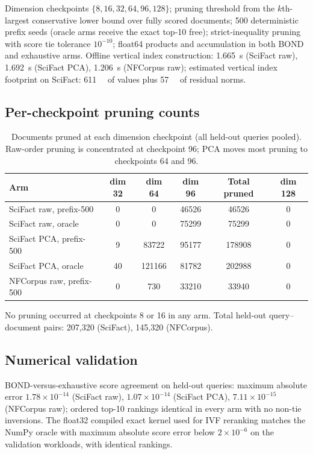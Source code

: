 Dimension checkpoints $\{8, 16, 32, 64, 96, 128\}$; pruning threshold from
the $k$th-largest conservative lower bound over fully scored documents;
500 deterministic prefix seeds (oracle arms receive the exact top-10 free);
strict-inequality pruning with score tie tolerance $10^{-10}$; float64
products and accumulation in both BOND and exhaustive arms. Offline vertical
index construction: \SI{1.665}{\second} (SciFact raw),
\SI{1.692}{\second} (SciFact PCA), \SI{1.206}{\second} (NFCorpus raw);
estimated vertical index footprint on SciFact: \SI{611}{\mega\byte} of values
plus \SI{57}{\mega\byte} of residual norms.

\subsection{Per-checkpoint pruning counts}

\begin{table}[ht]
  \centering
  \caption{Documents pruned at each dimension checkpoint (all held-out
    queries pooled). Raw-order pruning is concentrated at checkpoint 96;
    PCA moves most pruning to checkpoints 64 and 96.}
  \label{tab:checkpoints}
  \small
  \begin{tabular}{@{}l S[table-format=2.0] S[table-format=6.0] S[table-format=6.0] S[table-format=6.0] S[table-format=1.0]@{}}
    \toprule
    Arm & {dim 32} & {dim 64} & {dim 96} & {Total pruned} & {dim 128} \\
    \midrule
    SciFact raw, prefix-500  & 0  & 0      & 46526 & 46526  & 0 \\
    SciFact raw, oracle      & 0  & 0      & 75299 & 75299  & 0 \\
    SciFact PCA, prefix-500  & 9  & 83722  & 95177 & 178908 & 0 \\
    SciFact PCA, oracle      & 40 & 121166 & 81782 & 202988 & 0 \\
    NFCorpus raw, prefix-500 & 0  & 730    & 33210 & 33940  & 0 \\
    \bottomrule
  \end{tabular}
\end{table}

No pruning occurred at checkpoints 8 or 16 in any arm. Total held-out
query--document pairs: 207{,}320 (SciFact), 145{,}320 (NFCorpus).

\subsection{Numerical validation}

BOND-versus-exhaustive score agreement on held-out queries: maximum absolute
error $1.78 \times 10^{-14}$ (SciFact raw), $1.07 \times 10^{-14}$
(SciFact PCA), $7.11 \times 10^{-15}$ (NFCorpus raw); ordered top-10 rankings
identical in every arm with no non-tie inversions. The float32 compiled exact
kernel used for IVF reranking matches the NumPy oracle with maximum absolute
score error below $2 \times 10^{-6}$ on the validation workloads, with
identical rankings.
